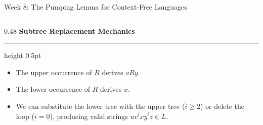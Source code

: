 \documentclass[aspectratio=169, 10pt]{beamer}
\newcommand{\colheader}[1]{%
  {\noindent\footnotesize\bfseries\color{gimpanavy}#1}%
  \vspace{0.03cm}%
  {\color{gimpanavy!30}\hrule height 0.5pt}%
  \vspace{0.08cm}%
}
\begin{document}
\begin{frame}{Week 8: The Pumping Lemma for Context-Free Languages}
\begin{columns}[T, onlytextwidth]
    \begin{column}{0.48\textwidth}
      \colheader{Subtree Replacement Mechanics}
      \begin{tcolorbox}[spotlightcard, top=3pt, bottom=3pt]
        \begin{itemize}\setlength{\itemsep}{2pt}\scriptsize
          \item The upper occurrence of $R$ derives $v R y$.
          \item The lower occurrence of $R$ derives $x$.
          \item We can substitute the lower tree with the upper tree ($i \ge 2$) or delete the loop ($i = 0$), producing valid strings $u v^i x y^i z \in L$.
        \end{itemize}
      \end{tcolorbox}
    \end{column}
  \end{columns}
\end{frame}
\end{document}

